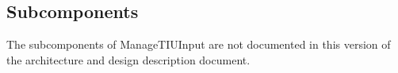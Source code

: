 \subsection{Subcomponents}\label{s:manageTIUOutput_subcomponents}

The subcomponents of ManageTIUInput are not documented in this version of the architecture and design description document.

%

%
